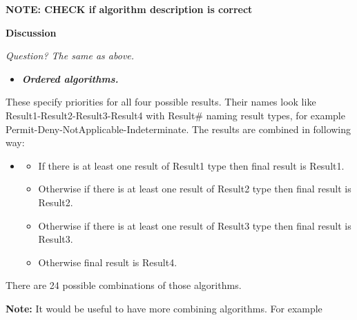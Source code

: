 \documentclass{article}
\newcommand\liststyleWWviiiNumxxi{%
\renewcommand\labelitemi{[F0B7?]}
\renewcommand\labelitemii{o}
\renewcommand\labelitemiii{[F0A7?]}
\renewcommand\labelitemiv{[F0B7?]}
}
\begin{document}
{\bfseries\color{black}
NOTE: CHECK if algorithm description is correct}

{\bfseries\color{black}
Discussion}

{\itshape\color{black}
Question? The same as above.}

\liststyleWWviiiNumxxi
\begin{itemize}
\item {\bfseries\itshape\color{black}
Ordered algorithms.}
\end{itemize}
{\color{black}
These specify priorities for all four possible results. Their names look
like Result1-Result2-Result3-Result4 with Result\# naming result types,
for example Permit-Deny-NotApplicable-Indeterminate. The results are
combined in following way:}

\liststyleWWviiiNumxxi
\begin{itemize}
\item \begin{itemize}
\item {\color{black}
If there is at least one result of Result1 type then final result is
Result1.}
\item {\color{black}
Otherwise if there is at least one result of Result2 type then final
result is Result2.}
\item {\color{black}
Otherwise if there is at least one result of Result3 type then final
result is Result3.}
\item {\color{black}
Otherwise final result is Result4.}
\end{itemize}
\end{itemize}
{\color{black}
There are 24 possible combinations of those algorithms.}

{\upshape\color{black}
\textbf{Note:} It would be useful to have more combining algorithms. For
example }
\end{document}
